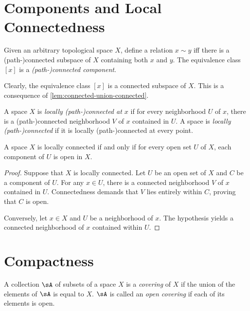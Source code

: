 \documentclass{amsart}
\begin{document}
\section{Components and Local Connectedness}
\label{sec:components-and-local-connectedness}

\begin{defn}
  Given an arbitrary topological space $X$, define a relation $x \sim y$ iff there is a (path-)connected subspace of $X$ containing both $x$ and $y$.
  The equivalence class $[x]$ is a \emph{(path-)connected component}.
\end{defn}

Clearly, the equivalence class $[x]$ is a connected subspace of $X$.
This is a consequence of \cref{lem:connected-union-connected}.

\begin{defn}
  A space $X$ is \emph{locally (path-)connected at $x$} if for every neighborhood $U$ of $x$, there is a (path-)connected neighborhood $V$ of $x$ contained in $U$.
  A space is \emph{locally (path-)connected} if it is locally (path-)connected at every point.
\end{defn}

\begin{lem}
  A space $X$ is locally connected if and only if for every open set $U$ of $X$, each component of $U$ is open in $X$.
\end{lem}
\begin{proof}
  Suppose that $X$ is locally connected.
  Let $U$ be an open set of $X$ and $C$ be a component of $U$.
  For any $x \in U$, there is a connected neighborhood $V$ of $x$ contained in $U$.
  Connectedness demands that $V$ lies entirely within $C$, proving that $C$ is open.

  Conversely, let $x \in X$ and $U$ be a neighborhood of $x$.
  The hypothesis yields a connected neighborhood of $x$ contained within $U$.
\end{proof}

\section{Compactness}
\label{sec:compactness}

\begin{defn}
  A collection $\sA$ of subsets of a space $X$ is a \emph{covering} of $X$ if the union of the elements of $\sA$ is equal to $X$.
  $\sA$ is called an \emph{open covering} if each of its elements is open.
\end{defn}
\end{document}
